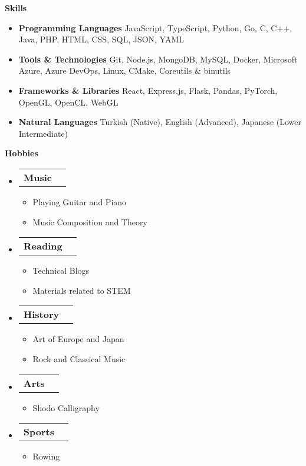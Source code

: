 \documentclass[letterpaper,12pt]{article}[leftmargin=*]
\makeatletter
\def \entryspacing {-0pt}
\renewcommand{\section}[2]{\vspace{5pt}
  \colorbox{secondary}{\color{white}\raggedbottom\normalsize\textbf{{#1}{\hspace{7pt}#2}}}
}
\newcommand{\resumeEntryStart}{\begin{itemize}[leftmargin=2.5mm]}
\newcommand{\resumeEntryEnd}{\end{itemize}\vspace{\entryspacing}}
\newcommand{\resumeItemListStart}{\begin{itemize}[leftmargin=4.5mm]}
\newcommand{\resumeItemListEnd}{\end{itemize}}
\newcommand{\resumeItem}[1]{
  \item\small{
    {#1 \vspace{-2pt}}
  }
}
\newcommand{\resumeEntryTD}[2]{
  \vspace{-1pt}\item[]
    \begin{tabularx}{0.97\textwidth}{X@{\hspace{60pt}}r}
      \textbf{\color{primary}#1} & {\firabook\color{accent}\small#2} \\
    \end{tabularx}\vspace{-6pt}
}
\newcommand{\resumeEntryS}[2]{
  \item[]\small{
    \textbf{\color{primary}#1 }{ #2 \vspace{-6pt}}
  }
}
\makeatother
\begin{document}
\section{\faGears}{Skills}
  \resumeEntryStart
    \resumeEntryS{Programming Languages} {JavaScript, TypeScript, Python, Go, C, C++, Java, PHP, HTML, CSS, SQL, JSON, YAML}
    \resumeEntryS{Tools \& Technologies} {Git, Node.js, MongoDB, MySQL, Docker, Microsoft Azure, Azure DevOps, Linux, CMake, Coreutils \& binutils}
    \resumeEntryS{Frameworks \& Libraries} {React, Express.js, Flask, Pandas, PyTorch, OpenGL, OpenCL, WebGL}
    \resumeEntryS{Natural Languages} {Turkish (Native), English (Advanced), Japanese (Lower Intermediate)}
  \resumeEntryEnd

\section{\faHeart}{Hobbies}
  \resumeEntryStart
    \resumeEntryTD{Music}{}
    \resumeItemListStart
      \resumeItem{Playing Guitar and Piano}
      \resumeItem{Music Composition and Theory}
    \resumeItemListEnd
    \resumeEntryTD{Reading}{}
    \resumeItemListStart
      \resumeItem{Technical Blogs}
      \resumeItem{Materials related to STEM}
    \resumeItemListEnd
    \resumeEntryTD{History}{}
    \resumeItemListStart
      \resumeItem{Art of Europe and Japan}
      \resumeItem{Rock and Classical Music}
    \resumeItemListEnd
    \resumeEntryTD{Arts}{}
    \resumeItemListStart
      \resumeItem{Shodo Calligraphy}
    \resumeItemListEnd
    \resumeEntryTD{Sports}{}
    \resumeItemListStart
      \resumeItem{Rowing}
    \resumeItemListEnd
  \resumeEntryEnd
\end{document}
